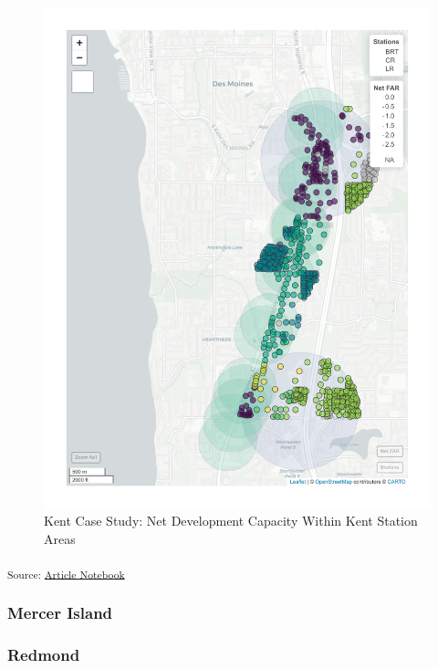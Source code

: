 \documentclass[
]{agujournal2019}
\begin{document}
\begin{figure}[H]

{\centering \includegraphics{index_files/figure-pdf/results-case-studies-kent-maps-1.pdf}

}

\caption{Kent Case Study: Net Development Capacity Within Kent Station
Areas}

\end{figure}%

\textsubscript{Source:
\href{https://tiernanmartin.github.io/2024-transit-oriented-development-bill/index.qmd.html}{Article
Notebook}}

\subsubsection{Mercer Island}\label{mercer-island}

\subsubsection{Redmond}\label{redmond}
\end{document}
